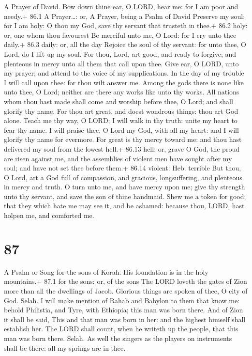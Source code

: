 A Prayer of David.  Bow down thine ear, O LORD, hear me: for
I am poor and needy.+ 86.1 A Prayer\ldots: or, A Prayer, being a Psalm
of David  Preserve my soul; for I am holy: O thou my God,
save thy servant that trusteth in thee.+ 86.2 holy: or, one whom thou
favourest  Be merciful unto me, O Lord: for I cry unto thee
daily.+ 86.3 daily: or, all the day  Rejoice the soul of thy
servant: for unto thee, O Lord, do I lift up my soul.  For
thou, Lord, art good, and ready to forgive; and plenteous in mercy unto
all them that call upon thee.  Give ear, O LORD, unto my
prayer; and attend to the voice of my supplications.  In the
day of my trouble I will call upon thee: for thou wilt answer me.
 Among the gods there is none like unto thee, O Lord;
neither are there any works like unto thy works.  All
nations whom thou hast made shall come and worship before thee, O Lord;
and shall glorify thy name.  For thou art great, and doest
wondrous things: thou art God alone.  Teach me thy way, O
LORD; I will walk in thy truth: unite my heart to fear thy name.
 I will praise thee, O Lord my God, with all my heart: and
I will glorify thy name for evermore.  For great is thy
mercy toward me: and thou hast delivered my soul from the lowest hell.+
86.13 hell: or, grave  O God, the proud are risen against
me, and the assemblies of violent men have sought after my soul; and
have not set thee before them.+ 86.14 violent: Heb. terrible
 But thou, O Lord, art a God full of compassion, and
gracious, longsuffering, and plenteous in mercy and truth. 
O turn unto me, and have mercy upon me; give thy strength unto thy
servant, and save the son of thine handmaid.  Shew me a
token for good; that they which hate me may see it, and be ashamed:
because thou, LORD, hast holpen me, and comforted me.

\hypertarget{section-86}{%
\section{87}\label{section-86}}

A Psalm or Song for the sons of Korah.  His foundation is in
the holy mountains.+ 87.1 for the sons: or, of the sons  The
LORD loveth the gates of Zion more than all the dwellings of Jacob.
 Glorious things are spoken of thee, O city of God. Selah.
 I will make mention of Rahab and Babylon to them that know
me: behold Philistia, and Tyre, with Ethiopia; this man was born there.
 And of Zion it shall be said, This and that man was born in
her: and the highest himself shall establish her.  The LORD
shall count, when he writeth up the people, that this man was born
there. Selah.  As well the singers as the players on
instruments shall be there: all my springs are in thee.

